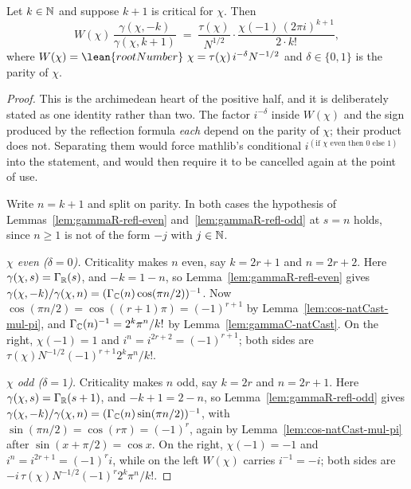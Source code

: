 \begin{lemma}
  \label{lem:gamma-quotient}
  \leanok
  Let $k \in \mathbb{N}$ and suppose $k+1$ is critical for $\chi$. Then
  \[ W(\chi)\,\frac{\gamma(\chi,-k)}{\gamma(\chi,k+1)}
     \;=\; \frac{\tau(\chi)}{N^{1/2}} \cdot
           \frac{\chi(-1)\,(2\pi i)^{k+1}}{2 \cdot k!}, \]
  where $W(\chi) = \lean{rootNumber}\ \chi = \tau(\chi)\, i^{-\delta} N^{-1/2}$ and
  $\delta \in \{0,1\}$ is the parity of $\chi$.
\end{lemma}
\begin{proof}
  \leanok
  This is the archimedean heart of the positive half, and it is deliberately stated as one
  identity rather than two. The factor $i^{-\delta}$ inside $W(\chi)$ and the sign produced by
  the reflection formula \emph{each} depend on the parity of $\chi$; their product does not.
  Separating them would force mathlib's conditional
  $i^{(\text{if } \chi \text{ even then } 0 \text{ else } 1)}$ into the statement, and would
  then require it to be cancelled again at the point of use.

  Write $n = k+1$ and split on parity. In both cases the hypothesis of
  Lemmas~\ref{lem:gammaR-refl-even} and~\ref{lem:gammaR-refl-odd} at $s = n$ holds, since
  $n \geq 1$ is not of the form $-j$ with $j \in \mathbb{N}$.

  \emph{$\chi$ even ($\delta = 0$).} Criticality makes $n$ even, say $k = 2r+1$ and
  $n = 2r+2$. Here $\gamma(\chi,s) = \Gamma_{\mathbb{R}}(s)$, and $-k = 1-n$, so
  Lemma~\ref{lem:gammaR-refl-even} gives
  $\gamma(\chi,-k)/\gamma(\chi,n) = (\Gamma_{\mathbb{C}}(n)\cos(\pi n/2))^{-1}$. Now
  $\cos(\pi n/2) = \cos((r+1)\pi) = (-1)^{r+1}$ by Lemma~\ref{lem:cos-natCast-mul-pi}, and
  $\Gamma_{\mathbb{C}}(n)^{-1} = 2^{k}\pi^{n}/k!$ by Lemma~\ref{lem:gammaC-natCast}. On the right,
  $\chi(-1) = 1$ and $i^{n} = i^{2r+2} = (-1)^{r+1}$; both sides are
  $\tau(\chi) N^{-1/2} (-1)^{r+1} 2^{k}\pi^{n}/k!$.

  \emph{$\chi$ odd ($\delta = 1$).} Criticality makes $n$ odd, say $k = 2r$ and $n = 2r+1$.
  Here $\gamma(\chi,s) = \Gamma_{\mathbb{R}}(s+1)$, and $-k+1 = 2-n$, so
  Lemma~\ref{lem:gammaR-refl-odd} gives
  $\gamma(\chi,-k)/\gamma(\chi,n) = (\Gamma_{\mathbb{C}}(n)\sin(\pi n/2))^{-1}$, with
  $\sin(\pi n/2) = \cos(r\pi) = (-1)^{r}$, again by
  Lemma~\ref{lem:cos-natCast-mul-pi} after $\sin(x + \pi/2) = \cos x$. On the right, $\chi(-1) = -1$ and
  $i^{n} = i^{2r+1} = (-1)^{r} i$, while on the left $W(\chi)$ carries $i^{-1} = -i$; both
  sides are $-i\,\tau(\chi) N^{-1/2} (-1)^{r} 2^{k}\pi^{n}/k!$.
\end{proof}

